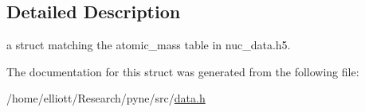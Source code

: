 \subsection{Detailed Description}
a struct matching the atomic\-\_\-mass table in nuc\-\_\-data.\-h5. 

The documentation for this struct was generated from the following file\-:\begin{DoxyCompactItemize}
\item 
/home/elliott/\-Research/pyne/src/\hyperlink{data_8h}{data.\-h}\end{DoxyCompactItemize}
